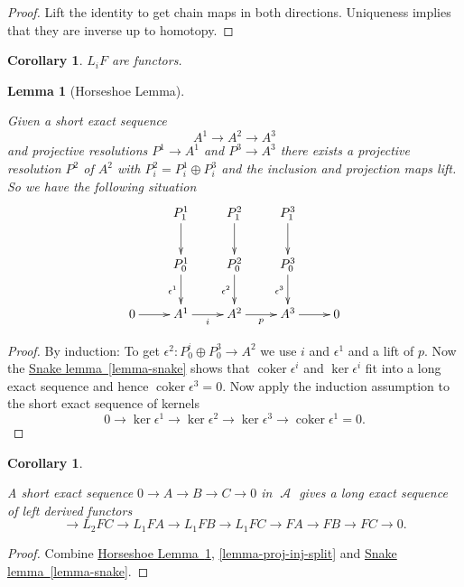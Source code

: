\documentclass[10pt,]{book}
\theoremstyle{plain}
\newtheorem{corollary}[theorem]{Corollary}
\newtheorem{lemma}[theorem]{Lemma}
\theoremstyle{definition}
\numberwithin{equation}{section}
\DeclareMathOperator{\coker}{coker}
\DeclareMathOperator{\cA}{\mathcal{A}}
\begin{document}
\begin{proof}

            Lift the identity to get chain maps in both directions.
            Uniqueness implies that they are inverse up to homotopy.
          \end{proof}
\begin{corollary}\label{corollary-3}
\(L_iF\) are functors.
          \end{corollary}
\begin{lemma}[Horseshoe Lemma]\label{lemma-horse}

            Given a short exact sequence
            \[
              A^1 \to A^2 \to A^3
            \]
            and projective resolutions \(P^1 \to A^1\) and \(P^3 \to A^3\) there exists a projective resolution \(P^2\) of \(A^2\) with \(P^2_i = P^1_i \oplus P^3_i\) and the inclusion and projection maps lift.
            So we have the following situation
            \[
              \xymatrix{
              &P_1^1 \ar[d] & P_1^2 \ar[d]&P_1^3\ar[d]&\\
              &P_0^1 \ar[d]_{\epsilon^1} & P_0^2 \ar[d]_{\epsilon^2}&P_0^3\ar[d]_{\epsilon^3}&\\
              0 \ar[r]& A^1 \ar[r]_i & A^2\ar[r]_p &A^3 \ar[r]&0
              }
            \]\end{lemma}
\begin{proof}

            By induction: To get \(\epsilon^2 \colon P_0^i \oplus P_0^3 \to A^2\) we use \(i\) and \(\epsilon^1\) and a lift of \(p\).
            Now the \hyperref[lemma-snake]{Snake lemma~\ref*{lemma-snake}} shows that \(\coker \epsilon^i\) and \(\ker \epsilon^i\) fit into a long exact sequence and hence \(\coker \epsilon^3 = 0\).
            Now apply the induction assumption to the short exact sequence of kernels 
            \[
              0 \to \ker \epsilon^1 \to \ker \epsilon^2\to \ker \epsilon^3 \to \coker \epsilon^1 = 0.
            \]\end{proof}
\begin{corollary}\label{corollary-4}

            A short exact sequence \(0 \to A \to B \to C \to 0\) in \(\cA\) gives a long exact sequence of left derived functors
            \[
              \to L_2FC \to L_1FA \to L_1 FB \to L_1FC\to FA \to FB \to FC \to 0.
            \]\end{corollary}
\begin{proof}

            Combine \hyperref[lemma-horse]{Horseshoe Lemma~\ref*{lemma-horse}}, \ref{lemma-proj-inj-split} and \hyperref[lemma-snake]{Snake lemma~\ref*{lemma-snake}}.
          \end{proof}
\end{document}
